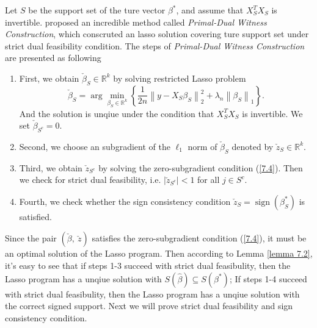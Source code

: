 \documentclass[12pt]{article}
\numberwithin{equation}{section}
\begin{document}
Let $S$ be the support set of the ture vector $\beta^{*}$, and assume that $X_{S}^{T} X_{S}$ is invertible. \citet*{wainwright2009sharp} proposed an incredible method called \textit{Primal-Dual Witness Construction}, which conscruted an lasso solution covering ture support set under strict dual feasibility condition. The steps of \textit{Primal-Dual Witness Construction} are presented as following
\begin{enumerate}
	\item First, we obtain $\check{\beta}_{S} \in \mathbb{R}^{k}$ by solving restricted Lasso problem
	\begin{equation}
	\check{\beta}_{S}=\arg \min _{\beta_{S} \in \mathbb{R}^{k}}\left\{\frac{1}{2 n}\left\|y-X_{S} \beta_{S}\right\|_{2}^{2}+\lambda_{n}\left\|\beta_{S}\right\|_{1}\right\}.
	\end{equation}
	And the solution is unqiue under the condition that $X_{S}^{T} X_{S}$ is invertible. We set $\check{\beta}_{S^c}=0$.
	\item Second, we choose an subgradient of the $\ell_1$ norm of $\check{\beta}_{S}$ denoted by $\check{z}_{S} \in \mathbb{R}^{k}$.
	\item Third, we obtain $\check{z}_{S^c}$ by solving the zero-subgradient condition (\ref{7.4}). Then we check for strict dual feasibility, i.e. $|\check{z}_{S^c}|<1$ for all $j\in S^c$.
	\item Fourth, we check whether the sign consistency condition $\check{z}_{S}=\operatorname{sign}\left(\beta_{S}^{*}\right)$ is satisfied.
\end{enumerate}

Since the pair $(\check{\beta},\ \check{z})$ satisfies the zero-subgradient condition (\ref{7.4}), it must be an optimal solution of the Lasso program. Then according to Lemma \ref{lemma 7.2}, it's easy to see that if steps 1-3 succeed with strict dual feasibulity, then the Lasso program has a unqiue solution with $S(\hat{\beta}) \subseteq S\left(\beta^{*}\right)$; If steps 1-4 succeed with strict dual feasibulity, then  the Lasso program has a unqiue solution with the correct signed support. Next we will prove strict dual feasibility and sign consistency condition.
\end{document}
